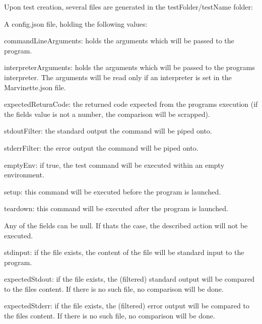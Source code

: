 Upon test creation, several files are generated in the {\ttfamily test\+Folder}/{\ttfamily test\+Name} folder\+:


\begin{DoxyItemize}
\item A {\ttfamily config.\+json} file, holding the following values\+:
\begin{DoxyItemize}
\item {\ttfamily command\+Line\+Arguments}\+: holds the arguments which will be passed to the program.
\item {\ttfamily interpreter\+Arguments}\+: holds the arguments which will be passed to the program\textquotesingle{}s interpreter. The arguments will be read only if an interpreter is set in the {\ttfamily Marvinette.\+json} file.
\item {\ttfamily expected\+Return\+Code}\+: the returned code expected from the program\textquotesingle{}s execution (if the field\textquotesingle{}s value is not a number, the comparison will be scrapped).
\item {\ttfamily stdout\+Filter}\+: the standard output the command will be piped onto.
\item {\ttfamily stderr\+Filter}\+: the error output the command will be piped onto.
\item {\ttfamily empty\+Env}\+: if true, the test command will be executed within an empty environment.
\item {\ttfamily setup}\+: this command will be executed before the program is launched.
\item {\ttfamily teardown}\+: this command will be executed after the program is launched.
\end{DoxyItemize}
\end{DoxyItemize}

Any of the fields can be null. If that\textquotesingle{}s the case, the described action will not be executed.


\begin{DoxyItemize}
\item {\ttfamily stdinput}\+: if the file exists, the content of the file will be standard input to the program.
\item {\ttfamily expected\+Stdout}\+: if the file exists, the (filtered) standard output will be compared to the file\textquotesingle{}s content. If there is no such file, no comparison will be done.
\item {\ttfamily expected\+Stderr}\+: if the file exists, the (filtered) error output will be compared to the file\textquotesingle{}s content. If there is no such file, no comparison will be done.
\end{DoxyItemize}

